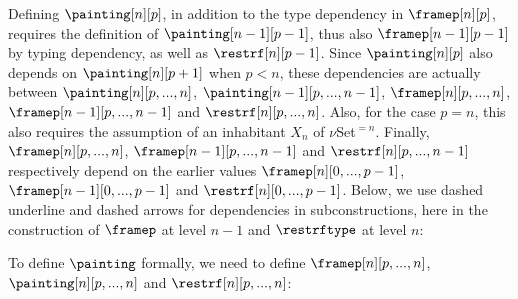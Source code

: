 \documentclass{msc}
\newcommand{\udensdash}[1]{%
    \tikz[baseline=(todotted.base)]{
        \node[inner sep=1pt,outer sep=0pt] (todotted) {$#1$};
        \draw[densely dashed] (todotted.south west) -- (todotted.south east);
    }%
}%
\begin{document}
Defining $\painting[n][p]$, in addition to the type dependency in $\framep[n][p]$, requires the definition of $\painting[n-1][p-1]$, thus also $\framep[n-1][p-1]$ by typing dependency, as well as $\restrf[n][p-1]$. Since $\painting[n][p]$ also depends on $\painting[n][p+1]$ when $p<n$, these dependencies are actually between $\painting[n][p,...,n]$, $\painting[n-1][p,...,n-1]$, $\framep[n][p,...,n]$, $\framep[n-1][p,...,n-1]$ and $\restrf[n][p,...,n]$. Also, for the case $p=n$, this also requires the assumption of an inhabitant $X_{n}$ of $\nu$Set$^{=n}$. Finally, $\framep[n][p,...,n]$, $\framep[n-1][p,...,n-1]$ and $\restrf[n][p,...,n-1]$ respectively depend on the earlier values $\framep[n][0,...,p-1]$, $\framep[n-1][0,...,p-1]$ and $\restrf[n][0,...,p-1]$.  Below, we use dashed underline and dashed arrows for dependencies in subconstructions, here in the construction of $\framep$ at level $n-1$ and $\restrftype$ at level $n$:
\begin{center}
  \fontsize{7.2}{9}\selectfont
\end{center}

To define $\painting$ formally, we need to define $\framep[n][p,...,n]$, $\painting[n][p,...,n]$ and $\restrf[n][p,...,n]$:
\end{document}
